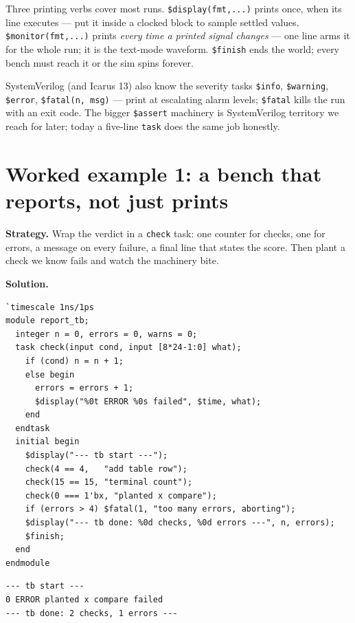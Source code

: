 %
 Three printing verbs cover most
runs. \texttt{\$display(fmt,...)} prints once, when its line executes
--- put it inside a clocked block to sample settled values.
\texttt{\$monitor(fmt,...)} prints \emph{every time a printed signal
changes} --- one line arms it for the whole run; it is the text-mode
waveform. \texttt{\$finish} ends the world; every bench must reach it
or the sim spins forever.

SystemVerilog (and Icarus 13) also know the severity tasks
\texttt{\$info}, \texttt{\$warning}, \texttt{\$error},
\texttt{\$fatal(n,~msg)} --- print at escalating alarm levels;
\texttt{\$fatal} kills the run with an exit code. The bigger
\texttt{\$assert} machinery is SystemVerilog territory we reach for
later; today a five-line \texttt{task} does the same job honestly.

\section{Worked example 1: a bench that reports, not just prints}
\label{sec:we-report}

\textbf{Strategy.} Wrap the verdict in a \texttt{check} task: one
counter for checks, one for errors, a message on every failure, a
final line that states the score. Then plant a check we know fails
and watch the machinery bite.

\textbf{Solution.}
\begin{lstlisting}[caption={\ttfamily code/ch12\_report\_tb.v ---
the check/report pattern in 18 lines. Notice the string argument
width \texttt{[8*24-1:0]}: Icarus truncates narrower task strings.},
label={lst:report}]
`timescale 1ns/1ps
module report_tb;
  integer n = 0, errors = 0, warns = 0;
  task check(input cond, input [8*24-1:0] what);
    if (cond) n = n + 1;
    else begin
      errors = errors + 1;
      $display("%0t ERROR %0s failed", $time, what);
    end
  endtask
  initial begin
    $display("--- tb start ---");
    check(4 == 4,   "add table row");
    check(15 == 15, "terminal count");
    check(0 === 1'bx, "planted x compare");
    if (errors > 4) $fatal(1, "too many errors, aborting");
    $display("--- tb done: %0d checks, %0d errors ---", n, errors);
    $finish;
  end
endmodule
\end{lstlisting}

\begin{lstlisting}[caption={Real run. Notice the planted line: one
ERROR, named, with the sim time; the verdict prints the honest score
2/3.},abovecaptionskip=0pt,label={lst:reportout}]
--- tb start ---
0 ERROR planted x compare failed
--- tb done: 2 checks, 1 errors ---
\end{lstlisting}

